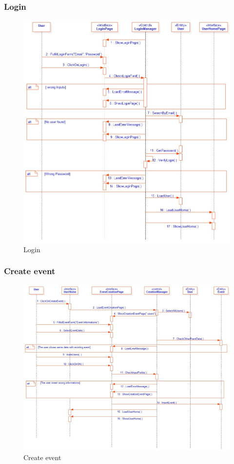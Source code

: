 \subsubsection{Login}
\begin{figure}[tbh]
  \begin{center}
  \includegraphics[width=150mm]{2log}
    \caption{Login}\label{Fig 1:}
  \end{center}
\end{figure}
\newpage
\subsubsection{Create event}
\begin{figure}[tbh]
  \begin{center}
  \includegraphics[width=150mm]{3create}
    \caption{Create event}\label{Fig 1:}
  \end{center}
\end{figure}
\newpage
